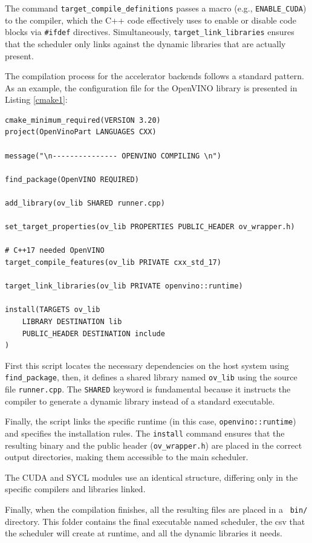 The command \texttt{target\_compile\_definitions} passes a macro (e.g., \texttt{ENABLE\_CUDA}) to the compiler, which the C++ code effectively uses to enable or disable code blocks via \texttt{\#ifdef} directives. Simultaneously, \texttt{target\_link\_libraries} ensures that the scheduler only links against the dynamic libraries that are actually present. 

The compilation process for the accelerator backends follows a standard pattern. As an example, the configuration file for the OpenVINO library is presented in Listing \ref{cmake1}:

\begin{lstlisting}[caption={CMakeLists.txt inside OpenVINO directory}, label={cmake1}]
cmake_minimum_required(VERSION 3.20)
project(OpenVinoPart LANGUAGES CXX)

message("\n--------------- OPENVINO COMPILING \n")

find_package(OpenVINO REQUIRED)

add_library(ov_lib SHARED runner.cpp)

set_target_properties(ov_lib PROPERTIES PUBLIC_HEADER ov_wrapper.h)

# C++17 needed OpenVINO
target_compile_features(ov_lib PRIVATE cxx_std_17)

target_link_libraries(ov_lib PRIVATE openvino::runtime)

install(TARGETS ov_lib 
    LIBRARY DESTINATION lib
    PUBLIC_HEADER DESTINATION include
)
\end{lstlisting}

First this script locates the necessary dependencies on the host system using \\ \texttt{find\_package}, then, it defines a shared library named \texttt{ov\_lib} using the source file \texttt{runner.cpp}. The \texttt{SHARED} keyword is fundamental because it instructs the compiler to generate a dynamic library instead of a standard executable.

Finally, the script links the specific runtime (in this case, \texttt{openvino::runtime}) and specifies the installation rules. The \texttt{install} command ensures that the resulting binary and the public header (\texttt{ov\_wrapper.h}) are placed in the correct output directories, making them accessible to the main scheduler.

The CUDA and SYCL modules use an identical structure, differing only in the specific compilers and libraries linked.

Finally, when the compilation finishes, all the resulting files are placed in a \texttt{ bin/} directory. This folder contains the final executable named scheduler, the csv that the scheduler will create at runtime, and all the dynamic libraries it needs.

